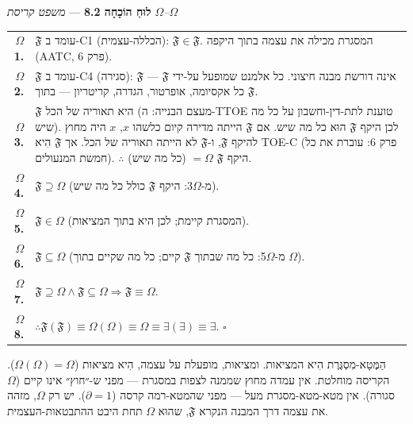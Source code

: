 \documentclass[10pt, openany, oneside]{book}
\renewcommand{\footnotesize}{\fontsize{8.5}{11}\selectfont}
\begin{document}
\vspace{0.5em}

\textbf{לוּחַ הוֹכָחָה 8.2} --- \textit{משפט קריסת $\Omega$--$\Omega$}

\vspace{0.5em}

{\footnotesize
\noindent\begin{tabular}{r p{}}
\textbf{$\Omega$1.} & $\mathfrak{F}$ עומד ב-C1 (הכללה-עצמית): $\mathfrak{F} \in \mathfrak{F}$. המסגרת מכילה את עצמה בתוך היקפה (AATC, פרק 6). \\[0.3em]
\textbf{$\Omega$2.} & $\mathfrak{F}$ עומד ב-C4 (סגירה): $\mathfrak{F}$ אינה דורשת מבנה חיצוני. כל אלמנט שמופעל על-ידי $\mathfrak{F}$ — כל אקסיומה, אופרטור, הגדרה, קריטריון — בתוך $\mathfrak{F}$. \\[0.3em]
\textbf{$\Omega$3.} & $\mathfrak{F}$ היא תאוריה של הכל (מעצם הבנייה: ה-TTOE טוענת לתת-דין-וחשבון על כל מה שיש). לכן היקף $\mathfrak{F}$ הוּא כל מה שיש. אם $\mathfrak{F}$ הייתה מדירה קיום כלשהו $x$, $x$ היה מחוץ להיקף $\mathfrak{F}$, ו-$\mathfrak{F}$ לא הייתה תאוריה של הכל. אך $\mathfrak{F}$ הִיא TOE-C (פרק 6: עוברת את כל חמשת המנעולים). $\therefore$ היקף $\mathfrak{F}$ $= \Omega$ (כל מה שיש). \\[0.3em]
\textbf{$\Omega$4.} & $\mathfrak{F} \supseteq \Omega$ (מ-$\Omega$3: היקף $\mathfrak{F}$ כולל כל מה שיש). \\[0.3em]
\textbf{$\Omega$5.} & $\mathfrak{F} \in \Omega$ (המסגרת קיימת; לכן היא בתוך המציאות). \\[0.3em]
\textbf{$\Omega$6.} & $\mathfrak{F} \subseteq \Omega$ (מ-$\Omega$5: כל מה שבתוך $\mathfrak{F}$ קיים; כל מה שקיים בתוך $\Omega$). \\[0.3em]
\textbf{$\Omega$7.} & $\mathfrak{F} \supseteq \Omega \wedge \mathfrak{F} \subseteq \Omega \Rightarrow \mathfrak{F} \equiv \Omega$. \\[0.3em]
\textbf{$\Omega$8.} & $\therefore \mathfrak{F}(\mathfrak{F}) \equiv \Omega(\Omega) \equiv \Omega \equiv \exists(\exists) \equiv \exists$. $\square$ \\[0.3em]
\end{tabular}
}

\vspace{0.8em}

\noindent הַמֶּטָא-מִסְגֶּרֶת הִיא המציאות. ומציאות, מופעלת על עצמה, הִיא מציאות ($\Omega(\Omega) = \Omega$). הקריסה מוחלטת. אין עמדה מחוץ שממנה לצפות במסגרת — מפני ש-״חוץ״ אינו קיים ($\Omega$ סגורה). אין מטא-מטא-מסגרת מעל — מפני שהמטא-רמה קרסה ($\partial = 1$). יש רק $\Omega$, מזהה את עצמה דרך המבנה הנקרא $\mathfrak{F}$, שהוּא $\Omega$ תחת היבט ההתבטאות-העצמית.
\end{document}
